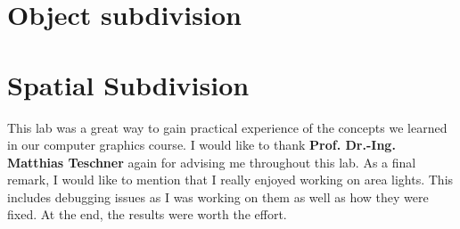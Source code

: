 \documentclass[11pt,a4paper]{article}
\begin{document}
	\section{Object subdivision}
	\section{Spatial Subdivision}
	
	This lab was a great way to gain practical experience of the concepts we learned in our computer graphics course. I would like to thank \textbf{Prof. Dr.-Ing. Matthias Teschner} again for advising me throughout this lab. As a final remark, I would like to mention that I really enjoyed working on area lights. This includes debugging issues as I was working on them as well as how they were fixed. At the end, the results were worth the effort.
	
	
	
	
\end{document}
